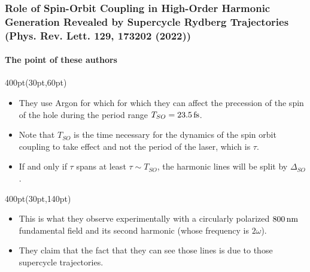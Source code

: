 \begin{frame}
\frametitle{
Role of Spin-Orbit Coupling in High-Order Harmonic Generation
Revealed by Supercycle Rydberg Trajectories
\footnotesize (Phys. Rev. Lett. 129, 173202 (2022))
}
	\framesubtitle{The point of these authors}
\small
\footnotesize
\begin{textblock*}{400pt}(30pt,60pt)
\begin{itemize}
\item They use Argon for which for which they can affect 
the precession of the spin  of the hole during the period range 
$T_{SO} = 23.5\, \rm fs$.
\item Note that $T_{SO} $ is the time necessary for the dynamics of the 
spin orbit coupling to take effect and not the period of the laser,
which is $\tau$.
\item If and only if $\tau$ spans at least $\tau \sim T_{SO}$, 
the harmonic lines will be split by $\Delta_{SO}$.
\end{itemize}
\end{textblock*}


\begin{textblock*}{400pt}(30pt,140pt)
\begin{itemize}
\item This is what they observe experimentally with a circularly polarized 
$800\,\rm nm$ fundamental field and its second harmonic 
(whose frequency is $2\omega$). 
\item They claim that the fact that they can see those lines is due to those
supercycle trajectories.
\end{itemize}
\end{textblock*}




\end{frame}



